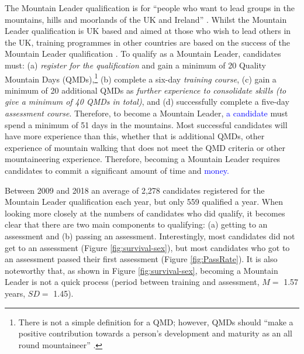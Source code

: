 \documentclass[
  12pt,
  a4paper,
]{book}
\begin{document}
The Mountain Leader qualification is for ``people who want to lead groups in the mountains, hills and moorlands of the UK and Ireland'' \citep[p 5]{MTUK2015a}. Whilst the Mountain Leader qualification is UK based and aimed at those who wish to lead others in the UK, training programmes in other countries are based on the success of the Mountain Leader qualification \citep{UIAA2015}. To qualify as a Mountain Leader, candidates must: (a) \emph{register for the qualification} and gain a minimum of 20 Quality Mountain Days (QMDs),\footnote{There is not a simple definition for a QMD; however, QMDs should ``make a positive contribution towards a person's development and maturity as an all round mountaineer'' \citep{MountainTraining2019}.} (b) complete a six-day \emph{training course}, (c) gain a minimum of 20 additional QMDs as \emph{further experience to consolidate skills (to give a minimum of 40 QMDs in total)}, and (d) successfully complete a five-day \emph{assessment course}. Therefore, to become a Mountain Leader, \textcolor{blue}{a candidate} must spend a minimum of 51 days in the mountains. Most successful candidates will have more experience than this, whether that is additional QMDs, other experience of mountain walking that does not meet the QMD criteria or other mountaineering experience. Therefore, becoming a Mountain Leader requires candidates to commit a significant amount of time and \textcolor{blue}{money.}

Between 2009 and 2018 an average of 2,278 candidates registered for the Mountain Leader qualification each year, but only 559 qualified a year. When looking more closely at the numbers of candidates who did qualify, it becomes clear that there are two main components to qualifying: (a) getting to an assessment and (b) passing an assessment. Interestingly, most candidates did not get to an assessment (Figure \ref{fig:survival-sex}), but most candidates who got to an assessment passed their first assessment (Figure \ref{fig:PassRate}). It is also noteworthy that, as shown in Figure \ref{fig:survival-sex}, becoming a Mountain Leader is not a quick process (period between training and assessment, \(M =\) 1.57 years, \(SD =\) 1.45).
\end{document}
